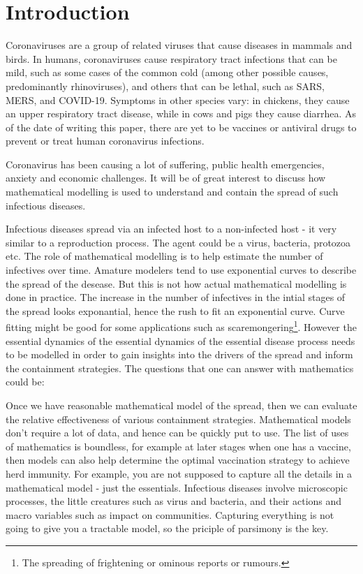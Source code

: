\documentclass[fontsize=17pt]{article}
\begin{document}
\tableofcontents
\newpage

\section{Introduction}
Coronaviruses are a group of related viruses that cause diseases in mammals and birds. In humans, coronaviruses cause respiratory tract infections that can be mild, such as some cases of the common cold (among other possible causes, predominantly rhinoviruses), and others that can be lethal, such as SARS, MERS, and COVID-19. Symptoms in other species vary: in chickens, they cause an upper respiratory tract disease, while in cows and pigs they cause diarrhea. As of the date of writing this paper, there are yet to be vaccines or antiviral drugs to prevent or treat human coronavirus infections.

Coronavirus has been causing a lot of suffering, public health emergencies, anxiety and economic challenges. It will be of great interest to discuss how mathematical modelling is used to understand and contain the spread of such infectious diseases.

Infectious diseases spread via an infected host to a non-infected host - it very similar to a reproduction process. The agent could be a virus, bacteria, protozoa etc. The role of mathematical modelling is to help estimate the number of infectives over time. Amature modelers tend to use exponential curves to describe the spread of the desease. But this is not how actual mathematical modelling is done in practice. The increase in the number of infectives in the intial stages of the spread looks exponantial, hence the rush to fit an exponential curve. Curve fitting might be good for some applications such as scaremongering\footnote{The spreading of frightening or ominous reports or rumours.}. However the essential dynamics of the essential dynamics of the essential disease process needs to be modelled in order to gain insights into the drivers of the spread and inform the containment strategies.
The questions that one can answer with mathematics could be:

Once we have reasonable mathematical model of the spread, then we can evaluate the relative effectiveness of various containment strategies. Mathematical models don't require a lot of data, and hence can be quickly put to use. The list of uses of mathematics is boundless, for example at later stages when one has a vaccine, then models can also help determine the optimal vaccination strategy to achieve herd immunity. For example, you are not supposed to capture all the details in a mathematical model - just the essentials. Infectious diseases involve microscopic processes, the little creatures such as virus and bacteria, and their actions and macro variables such as impact on communities. Capturing everything is not going to give you a tractable model, so the priciple of parsimony is the key.
\end{document}

